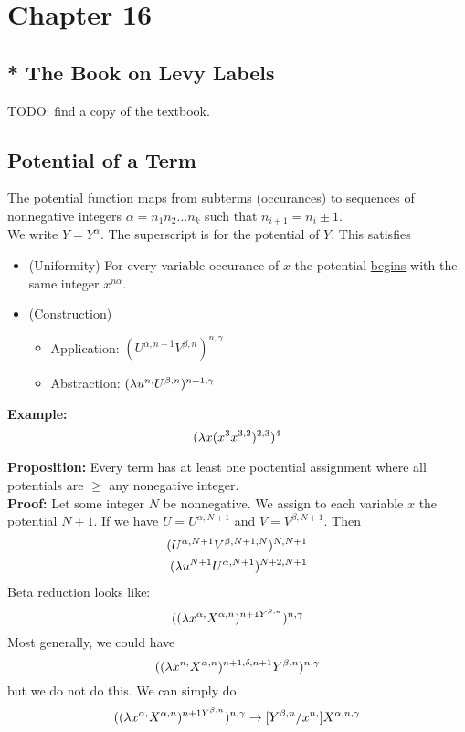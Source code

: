 \chapter{Chapter 16}

\section{* The Book on Levy Labels}
TODO: find a copy of the textbook.

\section{Potential of a Term}
The potential function maps from subterms (occurances) to sequences of nonnegative integers $\alpha = n_1n_2\ldots n_k$ such that $n_{i+1} = n_i \pm 1$.\\

We write $Y = Y^\alpha$. The superscript is for the potential of $Y$. This satisfies
\begin{itemize}
  \item (Uniformity) For every variable occurance of $x$ the potential \uline{begins} with the same integer $x^{n\alpha}$.
  \item (Construction)
    \begin{itemize}
      \item Application: $(U^{\alpha,n+1}V^{\beta,n})^{n,\gamma}$
      \item Abstraction: $(\lambda u^{n,} U^{\beta,n})^{n+1,\gamma}$
    \end{itemize}
\end{itemize}

\textbf{Example:}
\begin{equation*}
  (\lambda x (x^3 x^{3,2})^{2,3})^4
\end{equation*}

\textbf{Proposition:} Every term has at least one pootential assignment where all potentials are $\geq$ any nonegative integer.\\

\textbf{Proof:} Let some integer $N$ be nonnegative. We assign to each variable $x$ the potential $N + 1$. If we have $U = U^{\alpha, N+1}$ and $V = V^{\beta, N+1}$. Then
\begin{eqnarray*}
  (U^{\alpha,N+1}V^{\beta,N+1,N})^{N,N+1}\\
  (\lambda u^{N+1}U^{\alpha,N+1})^{N+2,N+1}\\
\end{eqnarray*}
Beta reduction looks like:
\begin{equation*}
  ((\lambda x^{\alpha,} X^{\alpha,n})^{n+1 Y^{\beta, n}})^{n,\gamma}
\end{equation*}
Most generally, we could have
\begin{equation*}
  ((\lambda x^{n,} X^{\alpha,n})^{n+1,\delta,n+1} Y^{\beta,n})^{n,\gamma}
\end{equation*}
but we do not do this. We can simply do
\begin{equation*}
  ((\lambda x^{\alpha,} X^{\alpha,n})^{n+1 Y^{\beta, n}})^{n,\gamma} \rightarrow [Y^{\beta,n}/x^{n,}]X^{\alpha,n,\gamma}
\end{equation*}

